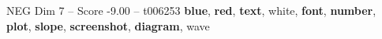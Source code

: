 \begin{textsample}{NEG Dim 7 – Score -9.00 – t006253}  \label{ex:f7_neg_001}
\textbf{blue}, \textbf{red}, \textbf{text}, white, \textbf{font}, \textbf{number}, \textbf{plot}, \textbf{slope}, \textbf{screenshot}, \textbf{diagram}, wave

\end{textsample}

